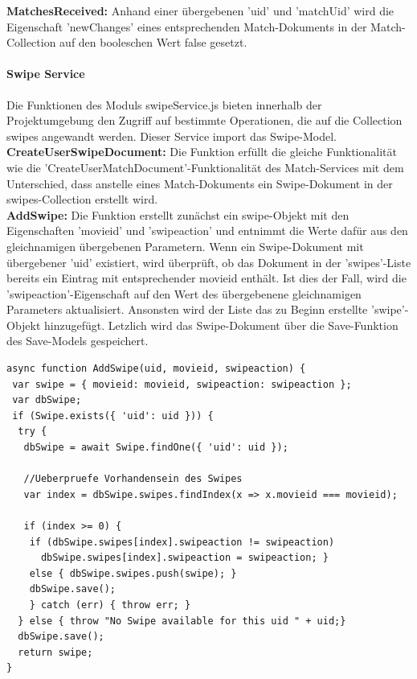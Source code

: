 \noindent
\textbf{MatchesReceived:}
Anhand einer übergebenen 'uid' und 'matchUid' wird die Eigenschaft 'newChanges' eines entsprechenden Match-Dokuments in der Match-Collection auf den booleschen Wert false gesetzt. 



%
%

\paragraph{Swipe Service}
Die Funktionen des Moduls swipeService.js bieten innerhalb der Projektumgebung den Zugriff auf bestimmte Operationen, die auf die Collection swipes angewandt werden. Dieser Service import das Swipe-Model.\\

\noindent
\textbf{CreateUserSwipeDocument:}
Die Funktion erfüllt die gleiche Funktionalität wie die 'Create\-UserMatchDocument'-Funktionalität des Match-Services mit dem Unterschied, dass anstelle eines Match-Dokuments ein Swipe-Dokument in der swipes-Collection erstellt wird.\\

\noindent
\textbf{AddSwipe:}
Die Funktion erstellt zunächst ein swipe-Objekt mit den Eigenschaften 'movieid' und 'swipeaction' und entnimmt die Werte dafür aus den gleichnamigen übergebenen Parametern. 
Wenn ein Swipe-Dokument mit übergebener 'uid' existiert, wird überprüft, ob das Dokument in der 'swipes'-Liste bereits ein Eintrag mit entsprechender movieid enthält. Ist dies der Fall, wird die 'swipeaction'-Eigenschaft auf den Wert des übergebenene gleichnamigen Parameters aktualisiert. Ansonsten wird der Liste das zu Beginn erstellte 'swipe'-Objekt hinzugefügt. Letzlich wird das Swipe-Dokument über die Save-Funktion des Save-Models gespeichert.

\begin{lstlisting}[caption=Swipe Service - AddSwipe, label=lst:swipeserviceaddswipe]
async function AddSwipe(uid, movieid, swipeaction) {
 var swipe = { movieid: movieid, swipeaction: swipeaction };
 var dbSwipe;
 if (Swipe.exists({ 'uid': uid })) {
  try {
   dbSwipe = await Swipe.findOne({ 'uid': uid });

   //Ueberpruefe Vorhandensein des Swipes
   var index = dbSwipe.swipes.findIndex(x => x.movieid === movieid);

   if (index >= 0) {
    if (dbSwipe.swipes[index].swipeaction != swipeaction)
      dbSwipe.swipes[index].swipeaction = swipeaction; }
    else { dbSwipe.swipes.push(swipe); }
    dbSwipe.save(); 
    } catch (err) { throw err; }
  } else { throw "No Swipe available for this uid " + uid;}
  dbSwipe.save();
  return swipe;
}
\end{lstlisting}

